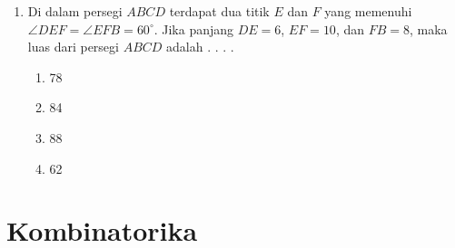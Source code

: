 \documentclass{article}
\begin{document}
\begin{enumerate}[label={Soal \arabic*}]
    \item Di dalam persegi $ABCD$ terdapat dua titik $E$ dan $F$ yang memenuhi $\angle DEF=\angle EFB=60^\circ$. Jika panjang $DE=6$, $EF=10$, dan $FB=8$, maka luas dari persegi $ABCD$ adalah . . . .
    \begin{enumerate}[label={(\Alph*)}]
        \item 78 \item 84 \item 88 \item 62
    \end{enumerate}
\end{enumerate}

\section*{Kombinatorika}
\end{document}

